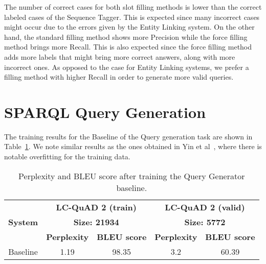 The number of correct cases for both slot filling methods is lower than the correct labeled cases 
of the Sequence Tagger. This is expected since many incorrect cases might occur due to the errors 
given by the Entity Linking system. On the other hand, the standard filling method shows more 
Precision while the force filling method brings more Recall. This is also expected since the force 
filling method adds more labels that might bring more correct answers, along with more incorrect 
ones. As opposed to the case for Entity Linking systems, we prefer a filling method with higher 
Recall in order to generate more valid \SPARQL{} queries.

\section{SPARQL Query Generation}
\label{cap5:results/sparqlQuery}

The training results for the Baseline of the \SPARQL{} Query generation task are shown in 
Table~\ref{table:queryGenerationTraining}. We note similar results as the ones obtained in 
Yin et al~\cite{nmt:nl-to-sparql-Yin19}, where there is notable overfitting for the training data.

\begin{table}[h!]
    \centering
    \begin{tabular}{|c|cc|cc|}
    \hline
    \multirow{3}{*}{\textbf{System}} & \multicolumn{2}{c|}{\textbf{LC-QuAD 2 (train)}}                         & \multicolumn{2}{c|}{\textbf{LC-QuAD 2 (valid)}}                         \\ \cline{2-5} 
                                     & \multicolumn{2}{c|}{\textbf{Size: 21934}}                               & \multicolumn{2}{c|}{\textbf{Size: 5772}}                                \\ \cline{2-5} 
                                     & \multicolumn{1}{c|}{\textbf{Perplexity}} & \textbf{BLEU score} & \multicolumn{1}{c|}{\textbf{Perplexity}} & \textbf{BLEU score} \\ \hline
    Baseline                         & 1.19                                     & 98.35               & 3.2                                      & 60.39               \\ \hline
    \end{tabular}%
    \caption{Perplexity and BLEU score after training the \SPARQL{} Query Generator baseline.}
    \label{table:queryGenerationTraining}
\end{table}


